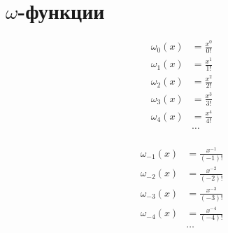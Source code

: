 
\section{$\omega$-функции}

\begin{equation*}\begin{aligned}
\omega_{0}(x) &= \frac{x^0}{0!} \\
\omega_{1}(x) &= \frac{x^1}{1!} \\
\omega_{2}(x) &= \frac{x^2}{2!} \\
\omega_{3}(x) &= \frac{x^3}{3!} \\
\omega_{4}(x) &= \frac{x^4}{4!} \\
&\ldots \\
\end{aligned}\end{equation*}

\begin{equation*}\begin{aligned}
\omega_{-1}(x) &= \frac{x^{-1}}{(-1)!} \\
\omega_{-2}(x) &= \frac{x^{-2}}{(-2)!} \\  
\omega_{-3}(x) &= \frac{x^{-3}}{(-3)!} \\
\omega_{-4}(x) &= \frac{x^{-4}}{(-4)!} \\
&\ldots \\
\end{aligned}\end{equation*}
